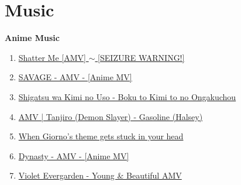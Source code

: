 \documentclass{article}
\begin{document}

\section{Music}

{\bf Anime Music}

\begin{enumerate}
	\item \href{https://www.youtube.com/watch?v=21nlozmIbP0}{Shatter Me [AMV] $\sim$ [SEIZURE WARNING!]}
	\item \href{https://www.youtube.com/watch?v=80fcg329zBY}{SAVAGE - AMV - [Anime MV]}
	\item \href{https://www.youtube.com/watch?v=i0Q7T_9vNNE}{Shigatsu wa Kimi no Uso - Boku to Kimi to no Ongakuchou}
	\item \href{https://www.youtube.com/watch?v=Gm-ywPzO0NA}{AMV | Tanjiro (Demon Slayer) - Gasoline (Halsey)}
	\item \href{https://www.youtube.com/watch?v=ZyCPOWdudiw}{When Giorno's theme gets stuck in your head}
	\item \href{https://www.youtube.com/watch?v=oxkgOEiE_HY}{Dynasty - AMV - [Anime MV]}
	\item \href{https://www.youtube.com/watch?v=TWEFFbh7rn0}{Violet Evergarden - Young \& Beautiful AMV}
\end{enumerate}
\end{document}
